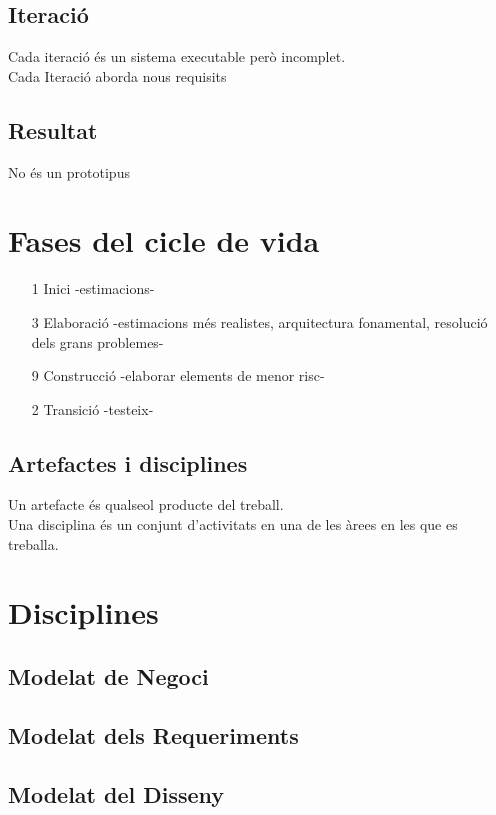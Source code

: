 \documentclass{article}
\begin{document}
\subsection{Iteració}
Cada iteració és un sistema executable però incomplet.\\
Cada Iteració aborda nous requisits
\subsection{Resultat}
No és un prototipus

\section{Fases del cicle de vida}
\begin{itemize}
\item[1] Inici -estimacions-
\item[3] Elaboració -estimacions més realistes, arquitectura fonamental, resolució dels grans problemes-
\item[9] Construcció -elaborar elements de menor risc-
\item[2] Transició -testeix-
\end{itemize}

\subsection{Artefactes i disciplines}
Un artefacte és qualseol producte del treball.\\
Una disciplina és un conjunt d'activitats en una de les àrees en les que es treballa.

\section{Disciplines}
\subsection{Modelat de Negoci}
\subsection{Modelat dels Requeriments}
\subsection{Modelat del Disseny}
\end{document}
